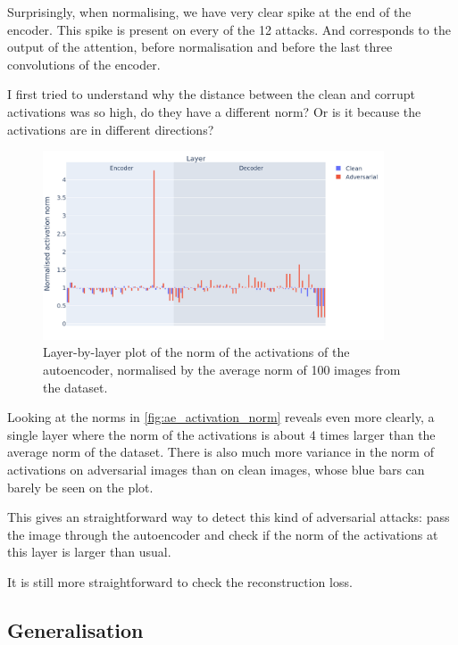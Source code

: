 \documentclass[]{scrarticle}
\begin{document}
Surprisingly, when normalising, we have very clear spike at the end of the encoder.
This spike is present on every of the 12 attacks.
And corresponds to the output of the attention, before normalisation
and before the last three convolutions of the encoder.

I first tried to understand why the distance between the clean
and corrupt activations was so high, do they have a different norm?
Or is it because the activations are in different directions?

\begin{figure}[h]
  \centering
  \includegraphics[width=0.9\textwidth]{../images/ae_activation_norm.png}
  \caption{
    Layer-by-layer plot of the norm of the activations of the autoencoder,
    normalised by the average norm of 100 images from the dataset.
  }
  \label{fig:ae_activation_norm}
\end{figure}

Looking at the norms in \autoref{fig:ae_activation_norm} reveals
even more clearly, a single layer where the norm of the activations is about
4 times larger than the average norm of the dataset.
There is also much more variance in the norm of activations
on adversarial images than on clean images, whose blue
bars can barely be seen on the plot.

This gives an straightforward way to detect this kind of adversarial
attacks: pass the image through the autoencoder and check if the
norm of the activations at this layer is larger than usual.


\begin{remark}
  It is still more straightforward to check the reconstruction loss.
\end{remark}

\subsection{Generalisation}
\end{document}
